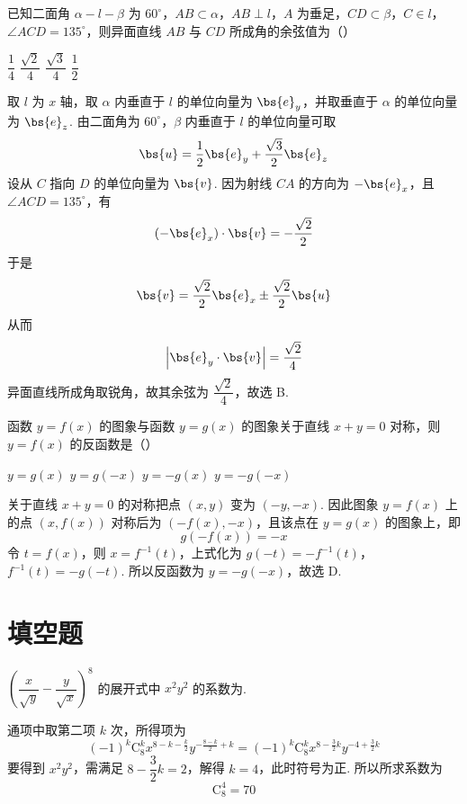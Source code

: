 \begin{problem}
已知二面角 \(\alpha-l-\beta\) 为 \(60^{\circ}\)，\(AB\subset \alpha\)，\(AB\perp l\)，\(A\) 为垂足，\(CD\subset \beta\)，\(C\in l\)，\(\angle ACD=135^{\circ}\)，则异面直线 \(AB\) 与 \(CD\) 所成角的余弦值为（\quad）

\choices
    {\(\dfrac{1}{4}\)}
    {\(\dfrac{\sqrt{2}}{4}\)}
    {\(\dfrac{\sqrt{3}}{4}\)}
    {\(\dfrac{1}{2}\)}

\begin{solution}
取 \(l\) 为 \(x\) 轴，取 \(\alpha\) 内垂直于 \(l\) 的单位向量为
\(\bs{e}_{y}\)，并取垂直于 \(\alpha\) 的单位向量为
\(\bs{e}_{z}\). 由二面角为 \(60^{\circ}\)，\(\beta\) 内垂直于
\(l\) 的单位向量可取
\[
\bs{u}=\frac12\bs{e}_{y}+\frac{\sqrt3}{2}\bs{e}_{z}
\]
设从 \(C\) 指向 \(D\) 的单位向量为 \(\bs{v}\). 因为射线 \(CA\) 的方向为
\(-\bs{e}_{x}\)，且 \(\angle ACD=135^{\circ}\)，有
\[
(-\bs{e}_{x})\cdot\bs{v}=-\frac{\sqrt2}{2}
\]
于是
\[
\bs{v}=\frac{\sqrt2}{2}\bs{e}_{x}
\pm\frac{\sqrt2}{2}\bs{u}
\]
从而
\[
\left|\bs{e}_{y}\cdot\bs{v}\right|=\frac{\sqrt2}{4}
\]
异面直线所成角取锐角，故其余弦为 \(\dfrac{\sqrt2}{4}\)，故选 B.
\end{solution}
\end{problem}

\begin{problem}
函数 \(y=f(x)\) 的图象与函数 \(y=g(x)\) 的图象关于直线 \(x+y=0\) 对称，则 \(y=f(x)\) 的反函数是（\quad）

\choices
    {\(y=g(x)\)}
    {\(y=g(-x)\)}
    {\(y=-g(x)\)}
    {\(y=-g(-x)\)}

\begin{solution}
关于直线 \(x+y=0\) 的对称把点 \((x,y)\) 变为 \((-y,-x)\). 因此图象
\(y=f(x)\) 上的点 \((x,f(x))\) 对称后为
\((-f(x),-x)\)，且该点在 \(y=g(x)\) 的图象上，即
\[
g(-f(x))=-x
\]
令 \(t=f(x)\)，则 \(x=f^{-1}(t)\)，上式化为
\(g(-t)=-f^{-1}(t)\)，\(f^{-1}(t)=-g(-t)\).
所以反函数为 \(y=-g(-x)\)，故选 D.
\end{solution}
\end{problem}

\section{填空题}

\begin{problem}
\(\left(\dfrac{x}{\sqrt{y}}-\dfrac{y}{\sqrt{x}}\right)^{8}\) 的展开式中 \(x^{2}y^{2}\) 的系数为\fillinblank{}.

\begin{solution}
通项中取第二项 \(k\) 次，所得项为
\[
(-1)^{k}\mathrm C_{8}^{k}
x^{8-k-\frac{k}{2}}y^{-\frac{8-k}{2}+k}
=(-1)^{k}\mathrm C_{8}^{k}x^{8-\frac32k}y^{-4+\frac32k}
\]
要得到 \(x^{2}y^{2}\)，需满足
\(8-\dfrac32k=2\)，解得 \(k=4\)，此时符号为正. 所以所求系数为
\[
\mathrm C_{8}^{4}=70
\]
\end{solution}
\end{problem}


